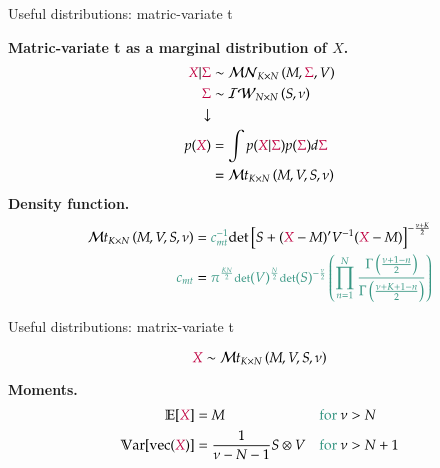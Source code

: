 \documentclass[notes,blackandwhite,mathsans,usenames,dvipsnames]{beamer}
\begin{document}
\begin{frame}{Useful distributions: matric-variate t}

\textbf{Matric-variate t as a marginal distribution of $X$.}
\begin{align*} 
{\color{purple}X}|{\color{purple}\Sigma} &\sim\mathcal{MN}_{K\times N}\left( M, {\color{purple}\Sigma}, V \right)\\
{\color{purple}\Sigma} &\sim\mathcal{IW}_{N\times N}\left( S, \nu \right)\\
\downarrow&\\
p({\color{purple}X}) &=\int p({\color{purple}X}|{\color{purple}\Sigma}) p({\color{purple}\Sigma})d{\color{purple}\Sigma}\\
&=\mathcal{M}t_{K\times N}\left( M, V, S, \nu \right)
\end{align*} 
\textbf{Density function.}
\begin{align*} 
\mathcal{M}t_{K\times N}\left( M, V, S, \nu \right) &= {\color{mcxs2}c_{mt}^{-1}}\text{det}\left[S + ({\color{purple}X}-M)'V^{-1}({\color{purple}X}-M) \right]^{-\frac{\nu+K}{2}}\\
{\color{mcxs2}c_{mt}}&=\footnotesize {\color{mcxs2}\pi^{\frac{KN}{2}}\text{det}(V)^{\frac{N}{2}}\text{det}(S)^{-\frac{\nu}{2}}\left( \prod_{n=1}^{N} \frac{\Gamma\left(\frac{\nu+1-n}{2}\right)}{\Gamma\left(\frac{\nu+K+1-n}{2}\right)} \right)}
\end{align*} 

\end{frame}


\begin{frame}{Useful distributions: matrix-variate t}

$$ {\color{purple}X} \sim\mathcal{M}t_{K\times N}\left( M, V, S, \nu \right) $$

\bigskip\textbf{Moments.}
\begin{align*} 
\mathbb{E}[{\color{purple}X}]&= M &\text{\color{mcxs2} for }\nu&>N\\
\mathbb{V}\text{ar}[\text{vec}({\color{purple}X})]&= \frac{1}{\nu-N-1}S\otimes V &\text{\color{mcxs2} for }\nu&>N+1
\end{align*} 

\end{frame}
\end{document}
